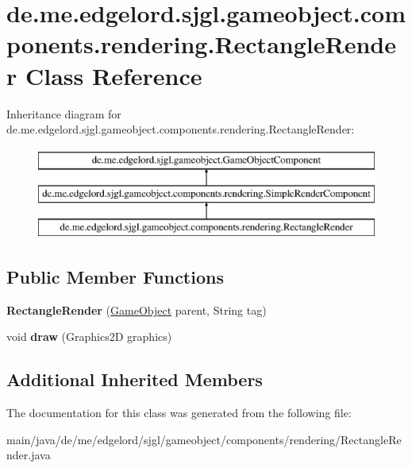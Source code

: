 \hypertarget{classde_1_1me_1_1edgelord_1_1sjgl_1_1gameobject_1_1components_1_1rendering_1_1_rectangle_render}{}\section{de.\+me.\+edgelord.\+sjgl.\+gameobject.\+components.\+rendering.\+Rectangle\+Render Class Reference}
\label{classde_1_1me_1_1edgelord_1_1sjgl_1_1gameobject_1_1components_1_1rendering_1_1_rectangle_render}
Inheritance diagram for de.\+me.\+edgelord.\+sjgl.\+gameobject.\+components.\+rendering.\+Rectangle\+Render\+:\begin{figure}[H]
\begin{center}
\leavevmode
\includegraphics[height=3.000000cm]{classde_1_1me_1_1edgelord_1_1sjgl_1_1gameobject_1_1components_1_1rendering_1_1_rectangle_render}
\end{center}
\end{figure}
\subsection*{Public Member Functions}
\begin{DoxyCompactItemize}
\item 
\mbox{\label{classde_1_1me_1_1edgelord_1_1sjgl_1_1gameobject_1_1components_1_1rendering_1_1_rectangle_render_a891badb1dc255e36405bac73981a46ea}} 
{\bfseries Rectangle\+Render} (\mbox{\hyperlink{classde_1_1me_1_1edgelord_1_1sjgl_1_1gameobject_1_1_game_object}{Game\+Object}} parent, String tag)
\item 
\mbox{\label{classde_1_1me_1_1edgelord_1_1sjgl_1_1gameobject_1_1components_1_1rendering_1_1_rectangle_render_a2344750e904fdf4f5c0c84e79ffb15ad}} 
void {\bfseries draw} (Graphics2D graphics)
\end{DoxyCompactItemize}
\subsection*{Additional Inherited Members}


The documentation for this class was generated from the following file\+:\begin{DoxyCompactItemize}
\item 
main/java/de/me/edgelord/sjgl/gameobject/components/rendering/Rectangle\+Render.\+java\end{DoxyCompactItemize}
